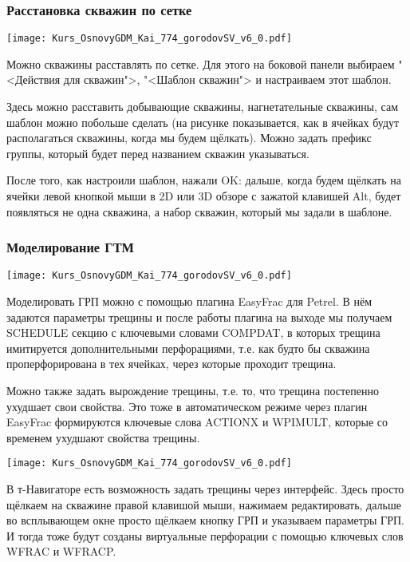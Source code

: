 \documentclass[main.tex]{subfiles}
\begin{document}
\subsubsection{Расстановка скважин по сетке}

\texttt{[image: Kurs\_OsnovyGDM\_Kai\_774\_gorodovSV\_v6\_0.pdf]}

Можно скважины расставлять по сетке.
Для этого на боковой панели выбираем "<Действия для скважин">, "<Шаблон скважин"> и настраиваем этот шаблон.

Здесь можно расставить добывающие скважины, нагнетательные скважины, сам шаблон можно побольше сделать (на рисунке показывается, как в ячейках будут располагаться скважины, когда мы будем щёлкать).
Можно задать префикс группы, который будет перед названием скважин указываться.

После того, как настроили шаблон, нажали OK: дальше, когда будем щёлкать на ячейки левой кнопкой мыши в 2D или 3D обзоре с зажатой клавишей Alt, будет появляться не одна скважина, а набор скважин, который мы задали в шаблоне.

\subsubsection{Моделирование ГТМ}

\texttt{[image: Kurs\_OsnovyGDM\_Kai\_774\_gorodovSV\_v6\_0.pdf]}

Моделировать ГРП можно с помощью плагина EasyFrac для Petrel.
В нём задаются параметры трещины и после работы плагина на выходе мы получаем SCHEDULE секцию с ключевыми словами COMPDAT, в которых трещина имитируется дополнительными перфорациями, т.е. как будто бы скважина проперфорирована в тех ячейках, через которые проходит трещина.

Можно также задать вырождение трещины, т.е. то, что трещина постепенно ухудшает свои свойства.
Это тоже в автоматическом режиме через плагин EasyFrac формируются ключевые слова ACTIONX и WPIMULT, которые со временем ухудшают свойства трещины.

\texttt{[image: Kurs\_OsnovyGDM\_Kai\_774\_gorodovSV\_v6\_0.pdf]}

В т-Навигаторе есть возможность задать трещины через интерфейс.
Здесь просто щёлкаем на скважине правой клавишой мыши, нажимаем редактировать, дальше во всплывающем окне просто щёлкаем кнопку ГРП и указываем параметры ГРП.
И тогда тоже будут созданы виртуальные перфорации с помощью ключевых слов WFRAC и WFRACP.
\end{document}
